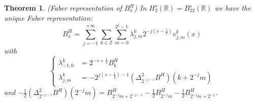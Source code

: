 \documentclass[11pt]{enstaPRE}
\newtheorem{theo}{Theorem}
\newcommand{\R}{\mathbb{R}}
\newcommand{\Z}{\mathbb{Z}}
\begin{document}
\begin{theo}(Faber representation of $B^H_x$)
    In $H^s_2(\R)=B^s_{22}(\R)$ we have the unique Faber representation:
    \begin{equation}
    B^H_x = \sum_{j=-1}^{+\infty}\sum_{k\in\Z}\sum_{m=0}^{2^j-1}\lambda_{j,m}^k2^{-j(s-\frac{1}{2})}v_{j,m}^k(x)
    \end{equation}    
    with \begin{equation}
    \begin{cases}
    \lambda^k_{-1,0} & = 2^{-s+\frac{1}{2}}B^H_k\\
    \lambda^k_{j,m} & = -2^{j(s-\frac{1}{2})-1} (\Delta^2_{2^{-j-1}}B^H)(k+2^{-j}m)
    \end{cases}
    \end{equation}
    and $-\frac{1}{2}(\Delta^2_{2^{-j-1}}B^H)(2^{-j}m) = B^H_{2^{-j}m+2^{-j-1}}-\frac{1}{2}B^H_{2^{-j}m}-\frac{1}{2}B^H_{2^{-j}m+2^{-j}}$.
\end{theo}
\end{document}
